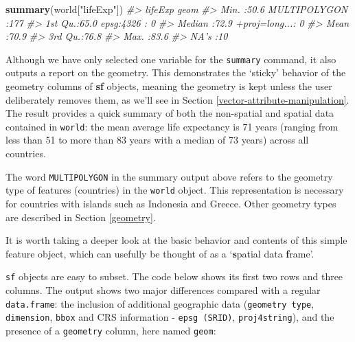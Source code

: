 \documentclass[]{krantz}
\newenvironment{Shaded}{\begin{snugshade}}{\end{snugshade}}
\newcommand{\CommentTok}[1]{\textcolor[rgb]{0.37,0.37,0.37}{\textit{#1}}}
\newcommand{\KeywordTok}[1]{\textcolor[rgb]{0.27,0.27,0.27}{\textbf{#1}}}
\newcommand{\NormalTok}[1]{#1}
\newcommand{\StringTok}[1]{\textcolor[rgb]{0.5,0.5,0.5}{#1}}
\let\BeginKnitrBlock\begin \let\EndKnitrBlock\end
\begin{document}
\begin{Shaded}
\begin{Highlighting}[]
\KeywordTok{summary}\NormalTok{(world[}\StringTok{"lifeExp"}\NormalTok{])}
\CommentTok{#>     lifeExp                geom    }
\CommentTok{#>  Min.   :50.6   MULTIPOLYGON :177  }
\CommentTok{#>  1st Qu.:65.0   epsg:4326    :  0  }
\CommentTok{#>  Median :72.9   +proj=long...:  0  }
\CommentTok{#>  Mean   :70.9                      }
\CommentTok{#>  3rd Qu.:76.8                      }
\CommentTok{#>  Max.   :83.6                      }
\CommentTok{#>  NA's   :10}
\end{Highlighting}
\end{Shaded}

Although we have only selected one variable for the \texttt{summary} command, it also outputs a report on the geometry.
This demonstrates the `sticky' behavior of the geometry columns of \textbf{sf} objects, meaning the geometry is kept unless the user deliberately removes them, as we'll see in Section \ref{vector-attribute-manipulation}.
The result provides a quick summary of both the non-spatial and spatial data contained in \texttt{world}: the mean average life expectancy is 71 years (ranging from less than 51 to more than 83 years with a median of 73 years) across all countries.

\BeginKnitrBlock{rmdnote}
The word \texttt{MULTIPOLYGON} in the summary output above refers to the geometry type of features (countries) in the \texttt{world} object.
This representation is necessary for countries with islands such as Indonesia and Greece.
Other geometry types are described in Section \ref{geometry}.
\EndKnitrBlock{rmdnote}

It is worth taking a deeper look at the basic behavior and contents of this simple feature object, which can usefully be thought of as a `\textbf{s}patial data \textbf{f}rame'.

\texttt{sf} objects are easy to subset.
The code below shows its first two rows and three columns.
The output shows two major differences compared with a regular \texttt{data.frame}: the inclusion of additional geographic data (\texttt{geometry\ type}, \texttt{dimension}, \texttt{bbox} and CRS information - \texttt{epsg\ (SRID)}, \texttt{proj4string}), and the presence of a \texttt{geometry} column, here named \texttt{geom}:
\end{document}
